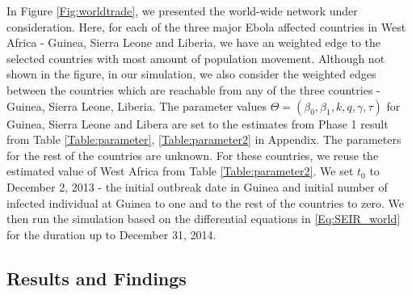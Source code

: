 \documentclass[10pt, journal,onecolumn]{IEEEtran}
\begin{document}
In Figure \ref{Fig:worldtrade}, we presented the world-wide network under consideration. Here, for
each of the three major Ebola affected countries in West Africa - Guinea, Sierra Leone and Liberia,
we have an weighted edge to the selected countries with most amount of population movement. Although
not shown in the figure, in our simulation, we also consider the weighted edges between the
countries which are reachable from any of the three countries -  Guinea, Sierra Leone,  Liberia.
The parameter values $\Theta=(\beta_0,\beta_1,k,q,\gamma, \tau)$ for Guinea, Sierra Leone and Libera
are set to the estimates from Phase 1 result from Table \ref{Table:parameter},
\ref{Table:parameter2} in Appendix. The parameters for the rest of the countries are unknown. For
these countries, we reuse the estimated value of West Africa from Table \ref{Table:parameter2}. We
set $t_0$ to December 2, 2013 - the initial outbreak date in Guinea and initial number of infected
individual at Guinea to one and to the rest of the countries to zero. We then run the simulation
based on the differential equations in \eqref{Eq:SEIR_world} for the duration up to December 31,
2014.

\subsection{Results and Findings}
\label{SubSec:WorldResult}
\end{document}

